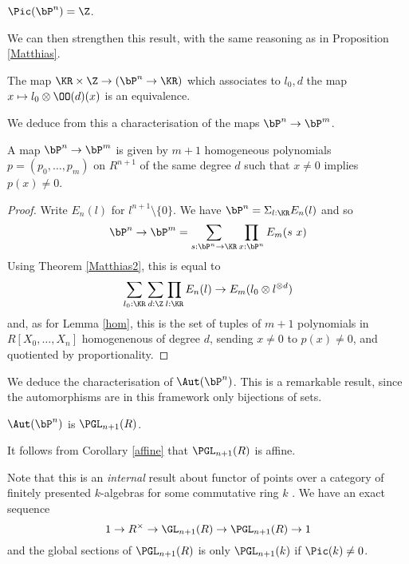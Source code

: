 \begin{corollary}
  $\Pic(\bP^n) = \Z$.
\end{corollary}

We can then strengthen this result, with the same reasoning as in Proposition \ref{Matthias}.

\begin{theorem}\label{Matthias2}
  The map $\KR\times\Z\rightarrow (\bP^n\rightarrow \KR)$
  which associates to $l_0,d$ the map $x\mapsto l_0\otimes \OO(d)(x)$ is an equivalence.
\end{theorem}

We deduce from this a characterisation of the maps $\bP^n\rightarrow\bP^m$.%

\begin{corollary}\label{map}
  A map $\bP^n\rightarrow\bP^m$ is given by $m+1$ homogeneous polynomials $p = (p_0,\dots,p_m)$ on $R^{n+1}$
  of the same   degree $d$ such that $x\neq 0$ implies $p(x)\neq 0$.
\end{corollary}

\begin{proof}
Write $E_n(l)$ for $l^{n+1}\setminus\{0\}$. We have $\bP^n = \Sigma_{l:\KR}E_n(l)$ and so
$$
\bP^n\rightarrow\bP^m = \sum_{s:\bP^n\rightarrow \KR}\prod_{x:\bP^n}E_m(s~x)
$$
Using Theorem \ref{Matthias2}, this is equal to
$$
\sum_{l_0:\KR}\sum_{d:\Z}\prod_{l:\KR}E_n(l)\rightarrow E_m(l_0\otimes l^{\otimes d})
$$
and, as for Lemma \ref{hom}, this is the set of tuples of $m+1$ polynomials in $R[X_0,\dots,X_n]$ homogenenous
of degree $d$, sending $x\neq 0$ to $p(x)\neq 0$, and quotiented by proportionality.
\end{proof}

We deduce the characterisation of $\Aut(\bP^n)$. This is a
remarkable result, since the automorphisms are in this framework only bijections of sets.

\begin{corollary}
  $\Aut(\bP^n)$ is $\PGL_{n+1}(R)$.
\end{corollary}

It follows from Corollary \ref{affine} that $\PGL_{n+1}(R)$ is affine.

\medskip

Note that this is an {\em internal} result about functor of points over a category of
finitely presented $k$-algebras for some commutative ring $k$ \cite{draft}. We have an exact sequence
$$
1\rightarrow R^{\times}\rightarrow \GL_{n+1}(R)\rightarrow \PGL_{n+1}(R)\rightarrow 1
$$
and the global sections of $\PGL_{n+1}(R)$ is only $\PGL_{n+1}(k)$ if $\Pic(k)\neq 0$.

